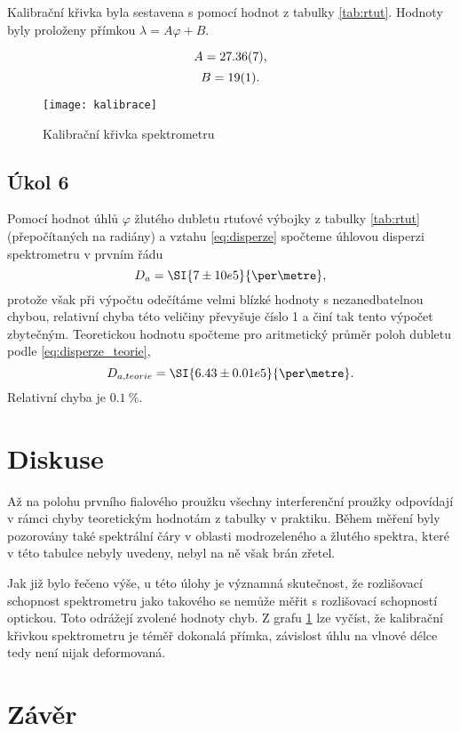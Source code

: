 \documentclass{protokol}
\begin{document}
      Kalibrační křivka byla sestavena s pomocí hodnot z tabulky \ref{tab:rtut}. Hodnoty byly proloženy přímkou $\lambda = A \varphi + B$.
      
      $$ A = \SI{27.36 \pm 0.07}{}, $$
      $$ B = \SI{19 \pm 1}{}. $$

      \begin{figure}[H]
        \centering
        \texttt{[image: kalibrace]}
        \caption{Kalibrační křivka spektrometru}
        \label{fig:kalibrace}
      \end{figure}

    \subsection*{Úkol 6}

      Pomocí hodnot úhlů $\varphi$ žlutého dubletu rtuťové výbojky z tabulky \ref{tab:rtut} (přepočítaných na radiány) a vztahu \eqref{eq:disperze} spočteme úhlovou disperzi spektrometru v prvním řádu 
      $$ D_a = \SI{7 \pm 10 e5}{\per\metre}, $$
      protože však při výpočtu odečítáme velmi blízké hodnoty s nezanedbatelnou chybou, relativní chyba této veličiny převyšuje číslo 1 a činí tak tento výpočet zbytečným.
      Teoretickou hodnotu spočteme pro aritmetický průměr poloh dubletu podle \eqref{eq:disperze_teorie},
      $$ D_{a, teorie} = \SI{6.43 \pm 0.01 e5}{\per\metre}. $$ 
      Relativní chyba je $\SI{0.1}{\percent}$.

  \section*{Diskuse}

    Až na polohu prvního fialového proužku všechny interferenční proužky odpovídají v rámci chyby teoretickým hodnotám z tabulky v praktiku. Během měření byly pozorovány také spektrální čáry v oblasti modrozeleného a žlutého spektra, které v této tabulce nebyly uvedeny, nebyl na ně však brán zřetel.
  
    Jak již bylo řečeno výše, u této úlohy je významná skutečnost, že rozlišovací schopnost spektrometru jako takového se nemůže měřit s rozlišovací schopností optickou. Toto odrážejí zvolené hodnoty chyb. Z grafu \ref{fig:kalibrace} lze vyčíst, že kalibrační křivkou spektrometru je téměř dokonalá přímka, závislost úhlu na vlnové délce tedy není nijak deformovaná.

  \section*{Závěr}
\end{document}
